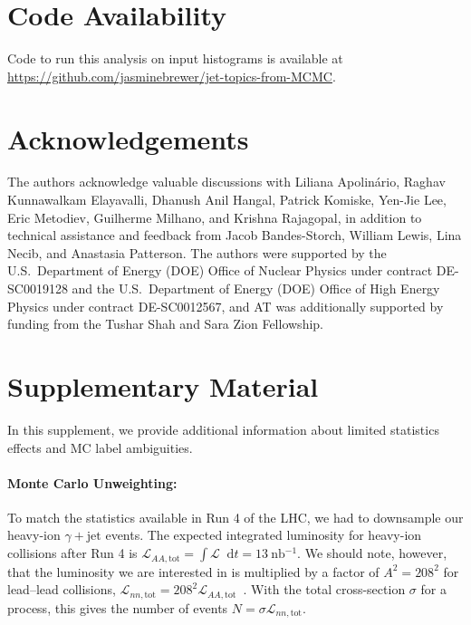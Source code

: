 \documentclass[aps,prl,twocolumn,preprintnumbers,showpacs,floatfix,nofootinbib]{revtex4-1}
\newcommand*{\diff}{\mathop{}\!\mathrm{d}}
\newcommand*{\cL}{\mathcal{L}}
\newcommand*{\jdt}[1]{\textcolor{green}{(JDT: #1)}}
\begin{document}
\section{Code Availability}

Code to run this analysis on input histograms is available at \url{https://github.com/jasminebrewer/jet-topics-from-MCMC}.


\section{Acknowledgements}

The authors acknowledge valuable discussions with Liliana Apolin\'{a}rio, Raghav Kunnawalkam Elayavalli, Dhanush Anil Hangal, Patrick Komiske, Yen-Jie Lee, Eric Metodiev, Guilherme Milhano, and Krishna Rajagopal, in addition to technical assistance and feedback from Jacob Bandes-Storch, William Lewis, Lina Necib, and Anastasia Patterson.
%
The authors were supported by the U.S.~Department of Energy (DOE) Office of Nuclear Physics under contract DE-SC0019128 and the U.S.~Department of Energy (DOE) Office of High Energy Physics under contract DE-SC0012567, and AT was additionally supported by funding from the Tushar Shah and Sara Zion Fellowship.
%


\section{Supplementary Material}

In this supplement, we provide additional information about limited statistics effects and MC label ambiguities.

\paragraph{Monte Carlo Unweighting:}
%
To match the statistics available in Run 4 of the LHC, we had to downsample our heavy-ion $\gamma+\text{jet}$ events.
%
The expected integrated luminosity for heavy-ion collisions after Run 4 is $\cL_{A A, \text{tot}} = \int \cL \diff t = \SI{13}{\nano\barn^{-1}}$.
%
We should note, however, that the luminosity we are interested in is multiplied by a factor of $A^2 = 208^2$ for lead--lead collisions, $\cL_{n n, \text{tot}} = 208^2 \cL_{A A, \text{tot}}$~\cite{Roland:2014jsa}.
%
With the total cross-section $\sigma$ for a process, this gives the number of events $N = \sigma \cL_{n n, \text{tot}}$.
\end{document}
